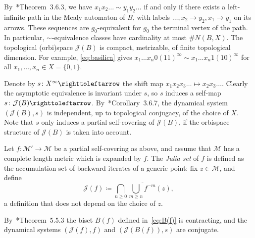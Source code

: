 \documentclass{amsart}
\newcommand\Julia{{\mathcal J}}
\begin{document}
By~\cite{nekrashevych:ssg}*{Theorem~3.6.3}, we have
$x_1x_2\dots\sim y_1y_2\dots$ if and only if there exists a
left-infinite path in the Mealy automaton of $B$, with labels
$\dots,x_2\to y_2,x_1\to y_1$ on its arrows. These sequences are
$g_0$-equivalent for $g_0$ the terminal vertex of the path. In
particular, $\sim$-equivalence classes have cardinality at most
$\#N(B,X)$.  The topological (orbi)space $\Julia(B)$ is compact,
metrizable, of finite topological dimension. For example,
\eqref{eq:basilica} gives
$x_1\dots x_n0(11)^\infty\sim x_1\dots x_n1(10)^\infty$ for all
$x_1,\dots,x_n\in X=\{0,1\}$.

Denote by $s\colon X^\infty\selfmap$ the shift map
$x_1x_2x_3\dots\mapsto x_2x_3\dots$. Clearly the asymptotic
equivalence is invariant under $s$, so $s$ induces a self-map
$s\colon\Julia(B)\selfmap$.
By~\cite{nekrashevych:ssg}*{Corollary~3.6.7}, the dynamical system
$(\Julia(B),s)$ is independent, up to topological conjugacy, of
the choice of $X$. Note that $s$ only induces a partial self-covering
of $\Julia(B)$, if the orbispace structure of $\Julia(B)$ is
taken into account.

Let $f\colon\mathcal M'\to\mathcal M$ be a partial self-covering as above, and
assume that $\mathcal M$ has a complete length metric which is
expanded by $f$. The \emph{Julia set} of $f$ is defined as the
accumulation set of backward iterates of a generic point: fix
$z\in\mathcal M$, and define
\begin{equation}\label{eq:julia}
  \Julia(f)\coloneqq\overline{\bigcap_{n\ge0}\bigcup_{m\ge n}f^{-m}(z)},
\end{equation}
a definition that does not depend on the choice of $z$.

By~\cite{nekrashevych:ssg}*{Theorem~5.5.3} the biset $B(f)$ defined
in~\eqref{eq:B(f)} is contracting, and the dynamical systems
$(\Julia(f),f)$ and $(\Julia(B(f)),s)$ are conjugate.
\end{document}
